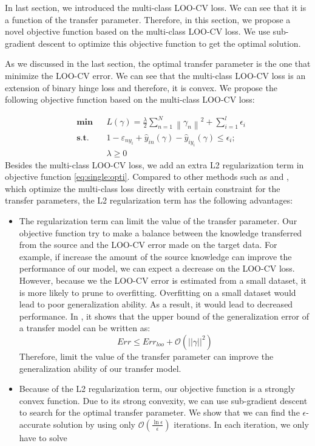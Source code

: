 In last section, we introduced the multi-class LOO-CV loss. We can see that it is a function of the transfer parameter. Therefore, in this section, we propose a novel objective function based on the multi-class LOO-CV loss. We use sub-gradient descent to optimize this objective function to get the optimal solution. 

As we discussed in the last section, the optimal transfer parameter is the one that minimize the LOO-CV error. We can see that the multi-class LOO-CV loss is an extension of binary hinge loss and therefore, it is convex. We propose the following objective function based on the multi-class LOO-CV loss:

\begin{equation}\label{eq:single:opti}
\begin{aligned}
& \textbf{min}
& & L(\gamma)=\frac{{{\lambda }}}{2}\sum\limits_{n = 1}^N {{{\left\| {{\gamma _n}} \right\|}^2}}  + \sum\limits_{i = 1}^l {{\epsilon_{i} }}   \\
& \textbf{s.t.}
& & 1 - {\varepsilon _{n{y_i}}} + {\hat y_{in}}\left( {\gamma  } \right) - {\hat y_{i{y_i}}}\left( {\gamma } \right) \le {{\epsilon_{i} }};\\
& & &\lambda \ge 0
\end{aligned}
\end{equation}
Besides the multi-class LOO-CV loss, we add an extra L2 regularization term in objective function \eqref{eq:single:opti}. Compared to other methods such as \cite{tommasi2010safety} and \cite{kuzborskij2013n}, which optimize the multi-class loss directly with certain constraint for the transfer parameters, the L2 regularization term has the following advantages:
\begin{itemize}
	\item The regularization term can limit the value of the transfer parameter. Our objective function try to make a balance between the knowledge transferred from the source and the LOO-CV error made on the target data. For example, if increase the amount of the source knowledge can improve the performance of our model, we can expect a decrease on the LOO-CV loss. However, because we the LOO-CV error is estimated from a small dataset, it is more likely to prune to overfitting. Overfitting on a small dataset would lead to poor generalization ability. As a result, it would lead to decreased performance. In \cite{kuzborskij2013stability}, it shows that the upper bound of the generalization error of a transfer model can be written as:
	\begin{equation}
		Err \leq Err_{loo}+\mathcal{O}(||\gamma||^2)
	\end{equation}
	Therefore, limit the value of the transfer parameter can improve the generalization ability of our transfer model.
	\item Because of the L2 regularization term, our objective function is a strongly convex function. Due to its strong convexity, we can use sub-gradient descent \cite{boyd2004convex} to search for the optimal transfer parameter. We show that we can find the $\epsilon$-accurate solution by using only $\mathcal{O}\left(\frac{\ln \epsilon}{\epsilon}\right)$ iterations. In each iteration, we only have to solve 
\end{itemize}
